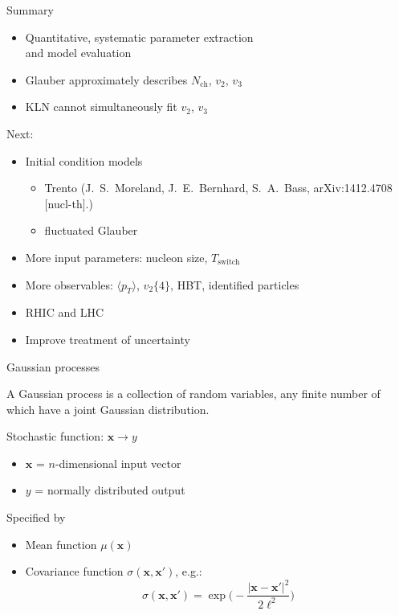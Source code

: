 \documentclass{beamer}
\newcommand{\avg}[1]{\langle #1 \rangle}
\newcommand{\nch}{N_\text{ch}}
\newcommand{\vnk}[2]{v_#1\{#2\}}
\newcommand{\x}{\mathbf x}
\begin{document}
\begin{frame}{Summary}
  \begin{itemize}
    \item Quantitative, systematic parameter extraction \\ and model evaluation
    \item Glauber approximately describes $\nch$, $v_2$, $v_3$
    \item KLN cannot simultaneously fit $v_2$, $v_3$
  \end{itemize}
  \medskip
  Next:
  \begin{itemize}
    \item Initial condition models
      \begin{itemize}
        \item Trento {\tiny(J.~S.~Moreland, J.~E.~Bernhard, S.~A.~Bass, arXiv:1412.4708 [nucl-th].)}
        \item fluctuated Glauber
      \end{itemize}
    \item More input parameters: nucleon size, $T_\text{switch}$ \\
    \item More observables: $\avg{p_T}$, $\vnk 2 4$, HBT, identified particles
    \item RHIC and LHC
    \item Improve treatment of uncertainty
  \end{itemize}
\end{frame}


\appendix


\begin{frame}{Gaussian processes}
  \begin{definition}
    A Gaussian process is a collection of random variables, any finite number of which have a joint Gaussian distribution.
  \end{definition}
  \medskip
  Stochastic function: $\x \rightarrow y$ \\
  \begin{itemize}
    \item $\x$ = $n$-dimensional input vector
    \item $y$ = normally distributed output
  \end{itemize}
  Specified by
  \begin{itemize}
    \item Mean function $\mu(\x)$
    \item Covariance function $\sigma(\x, \x')$, e.g.:
      \begin{equation*}
        \sigma(\x, \x') = \exp\biggl( -\frac{|\x - \x'|^2}{2\ell^2} \biggr)
      \end{equation*}
  \end{itemize}
\end{frame}
\end{document}
